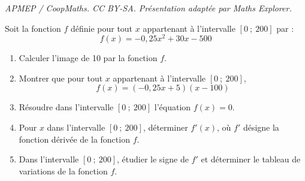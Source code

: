 \documentclass[10pt]{article}
\begin{document}
\noindent\textit{APMEP / CoopMaths. CC BY-SA. Présentation adaptée par Maths Explorer.}\par\medskip
Soit la fonction $f$ définie pour tout $x$ appartenant à l'intervalle $[0~;~200]$ par :
\[ f(x)=-0{,}25x^{2}+30x-500 \]

\begin{enumerate}
	\item Calculer l'image de 10 par la fonction $f$.
	\item Montrer que pour tout $x$ appartenant à l'intervalle $[0~;~200]$,
	\[ f(x)=(-0{,}25x+5)(x-100) \]
	\item Résoudre dans l'intervalle $[0~;~200]$ l'équation $f(x)=0$.
	\item Pour $x$ dans l'intervalle $[0~;~200]$, déterminer $f'(x)$, où $f'$ désigne la fonction dérivée de la fonction $f$.
	\item Dans l'intervalle $[0~;~200]$, étudier le signe de $f'$ et déterminer le tableau de variations de la fonction $f$.
\end{enumerate}
\end{document}
